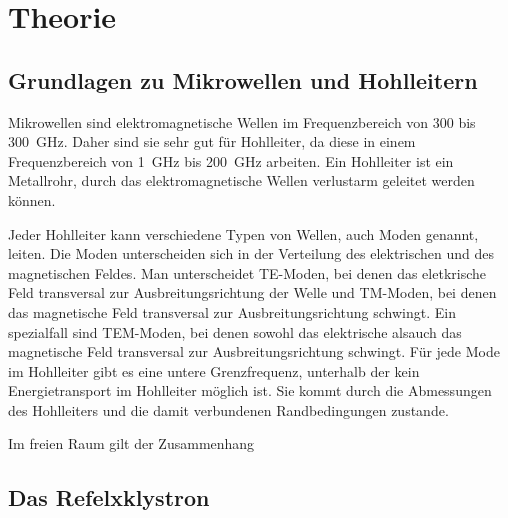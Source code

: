 \section{Theorie}
\label{sec:Theorie}

\subsection{Grundlagen zu Mikrowellen und Hohlleitern}
\label{subsec:grundlagen}
Mikrowellen sind elektromagnetische Wellen im Frequenzbereich von \SI{300}{\Mhz}
bis \SI{300}{\GHz}. Daher sind sie sehr gut für Hohlleiter, da diese in einem
Frequenzbereich von \SI{1}{\GHz} bis \SI{200}{\GHz} arbeiten. Ein Hohlleiter ist
ein Metallrohr, durch das elektromagnetische Wellen verlustarm geleitet werden können.

Jeder Hohlleiter kann verschiedene Typen von Wellen, auch Moden genannt, leiten.
Die Moden unterscheiden sich in der Verteilung des elektrischen und des magnetischen
Feldes. Man unterscheidet TE-Moden, bei denen das eletkrische Feld transversal zur
Ausbreitungsrichtung der Welle und TM-Moden, bei denen das magnetische Feld transversal
zur Ausbreitungsrichtung schwingt. Ein spezialfall sind TEM-Moden, bei denen sowohl
das elektrische alsauch das magnetische Feld transversal zur Ausbreitungsrichtung
schwingt. Für jede Mode im Hohlleiter gibt es eine untere Grenzfrequenz, unterhalb
der kein Energietransport im Hohlleiter möglich ist. Sie kommt durch die Abmessungen
des Hohlleiters und die damit verbundenen Randbedingungen zustande.

Im freien Raum gilt der Zusammenhang
\equation{}


\subsection{Das Refelxklystron}
\label{subsec:klystron}
